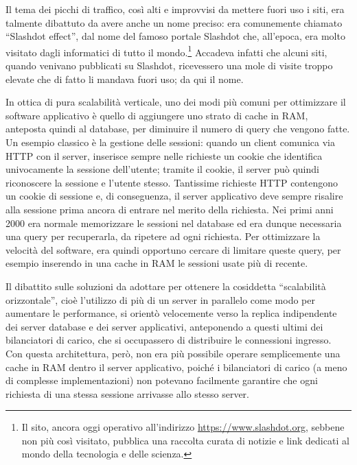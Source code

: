 Il tema dei picchi di traffico, così alti e improvvisi da mettere fuori uso i siti, era talmente
dibattuto da avere anche un nome preciso: era comunemente chiamato ``Slashdot effect'', dal nome del
famoso portale Slashdot che, all'epoca, era molto visitato dagli informatici di tutto il
mondo.\footnote{Il sito, ancora oggi operativo all'indirizzo \url{https://www.slashdot.org}, sebbene
non più così visitato, pubblica una raccolta curata di notizie e link dedicati al mondo della
tecnologia e delle scienza.} Accadeva infatti che alcuni siti, quando venivano pubblicati su
Slashdot, ricevessero una mole di visite troppo elevate che di fatto li mandava fuori uso; da qui il
nome.

In ottica di pura scalabilità verticale, uno dei modi più comuni per ottimizzare il software
applicativo è quello di aggiungere uno strato di cache in RAM, anteposta quindi al database, per
diminuire il numero di query che vengono fatte. Un esempio classico è la gestione delle sessioni:
quando un client comunica via HTTP con il server, inserisce sempre nelle richieste un cookie che
identifica univocamente la sessione dell'utente; tramite il cookie, il server può quindi riconoscere
la sessione e l'utente stesso. Tantissime richieste HTTP contengono un cookie di sessione e, di
conseguenza, il server applicativo deve sempre risalire alla sessione prima ancora di entrare nel
merito della richiesta. Nei primi anni 2000 era normale memorizzare le sessioni nel database ed era
dunque necessaria una query per recuperarla, da ripetere ad ogni richiesta. Per ottimizzare la
velocità del software, era quindi opportuno cercare di limitare queste query, per esempio inserendo
in una cache in RAM le sessioni usate più di recente.

Il dibattito sulle soluzioni da adottare per ottenere la cosiddetta ``scalabilità orizzontale'',
cioè l'utilizzo di più di un server in parallelo come modo per aumentare le performance, si orientò
velocemente verso la replica indipendente dei server database e dei server applicativi, anteponendo
a questi ultimi dei bilanciatori di carico, che si occupassero di distribuire le connessioni
ingresso. Con questa architettura, però, non era più possibile operare semplicemente una cache in RAM
dentro il server applicativo, poiché i bilanciatori di carico (a meno di complesse implementazioni)
non potevano facilmente garantire che ogni richiesta di una stessa sessione arrivasse allo stesso
server.

